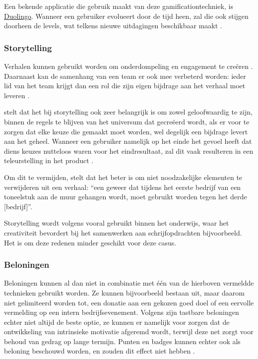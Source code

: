 Een bekende applicatie die gebruik maakt van deze gamificationtechniek, is \href{https://www.duolingo.com/}{Duolingo}. Wanneer een gebruiker evolueert door de tijd heen, zal die ook stijgen doorheen de levels, wat telkens nieuwe uitdagingen beschikbaar maakt \autocite{Shortt2021}.

\subsubsection{Storytelling}
Verhalen kunnen gebruikt worden om onderdompeling en engagement te creëren \autocite{ManzanoLeon2021}. Daarnaast kan de samenhang van een team er ook mee verbeterd worden: ieder lid van het team krijgt dan een rol die zijn eigen bijdrage aan het verhaal moet leveren \autocite{ManzanoLeon2021}.

\textcite{Marczewski2015} stelt dat het bij storytelling ook zeer belangrijk is om zowel geloofwaardig te zijn, binnen de regels te blijven van het universum dat gecreëerd wordt, als er voor te zorgen dat elke keuze die gemaakt moet worden, wel degelijk een bijdrage levert aan het geheel. Wanneer een gebruiker namelijk op het einde het gevoel heeft dat diens keuzes nutteloos waren voor het eindresultaat, zal dit vaak resulteren in een teleurstelling in het product \autocite{Marczewski2015}.

Om dit te vermijden, stelt \textcite{Duster1990} dat het beter is om niet noodzakelijke elementen te verwijderen uit een verhaal: ``een geweer dat tijdens het eerste bedrijf van een toneelstuk aan de muur gehangen wordt, moet gebruikt worden tegen het derde [bedrijf]''.

Storytelling wordt volgens \textcite{Schmoelz2018} vooral gebruikt binnen het onderwijs, waar het creativiteit bevordert bij het samenwerken aan schrijfopdrachten bijvoorbeeld. Het is om deze redenen minder geschikt voor deze casus.

\subsubsection{Beloningen}
Beloningen kunnen al dan niet in combinatie met één van de hierboven vermeldde technieken gebruikt worden. Ze kunnen bijvoorbeeld bestaan uit, maar daarom niet gelimiteerd worden tot, een donatie aan een gekozen goed doel of een eervolle vermelding op een intern bedrijfsevenement.
Volgens \textcite{Lewis2016} zijn tastbare beloningen echter niet altijd de beste optie, ze kunnen er namelijk voor zorgen dat de ontwikkeling van intrinsieke motivatie afgeremd wordt, terwijl deze net zorgt voor behoud van gedrag op lange termijn. Punten en badges kunnen echter ook als beloning beschouwd worden, en zouden dit effect niet hebben \autocite{Lewis2016}.

